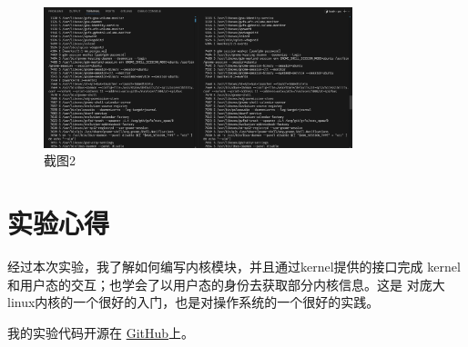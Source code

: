 \begin{figure}[!h]
	\centering
	\includegraphics[width=0.8\textwidth]{../fig/p2.png}
	\caption{截图2}
\end{figure}

\section{实验心得}
经过本次实验，我了解如何编写内核模块，并且通过kernel提供的接口完成
kernel和用户态的交互；也学会了以用户态的身份去获取部分内核信息。这是
对庞大linux内核的一个很好的入门，也是对操作系统的一个很好的实践。

我的实验代码开源在 
\href{https://github.com/JackeyHua-SJTU/linux-kernel}{GitHub}上。
